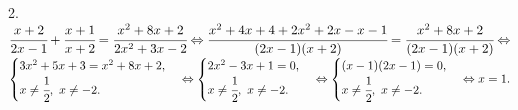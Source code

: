 2. $\cfrac{x+2}{2x-1}+\cfrac{x+1}{x+2}=\cfrac{x^2+8x+2}{2x^2+3x-2}\Leftrightarrow \cfrac{x^2+4x+4+2x^2+2x-x-1}{(2x-1)(x+2)}=\cfrac{x^2+8x+2}{(2x-1)(x+2)}\Leftrightarrow$\\$
\begin{cases} 3x^2+5x+3=x^2+8x+2,\\ x\neq\cfrac{1}{2},\ x\neq-2.\end{cases}\Leftrightarrow
\begin{cases} 2x^2-3x+1=0,\\ x\neq\cfrac{1}{2},\ x\neq-2.\end{cases}\Leftrightarrow
\begin{cases} (x-1)(2x-1)=0,\\ x\neq\cfrac{1}{2},\ x\neq-2.\end{cases}\Leftrightarrow x=1.$\\
